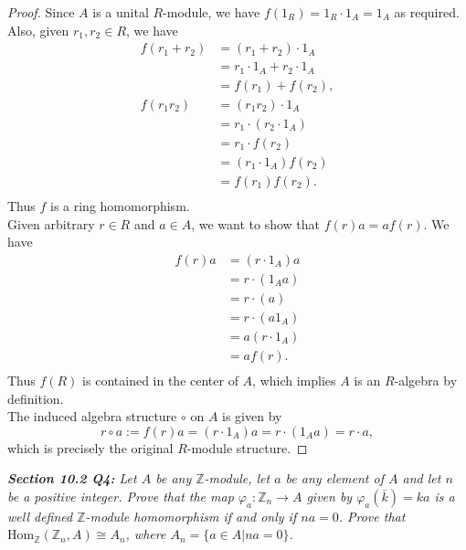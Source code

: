 \documentclass{article}
\begin{document}
  \begin{proof}
    Since $A$ is a unital $R$-module, we have $f(1_R)=1_R\cdot1_A=1_A$ as
    required. Also, given $r_1,r_2\in R$, we have
    \begin{align*}
      f(r_1+r_2) &=(r_1+r_2)\cdot1_A \\
      &=r_1\cdot1_A + r_2\cdot1_A \\
      &=f(r_1)+f(r_2), \\
      f(r_1r_2) &=(r_1r_2)\cdot1_A \\
      &=r_1\cdot(r_2\cdot1_A) \\
      &=r_1\cdot f(r_2) \\
      &=(r_1\cdot1_A)f(r_2) \\
      &=f(r_1)f(r_2). \\
    \end{align*}
    Thus $f$ is a ring homomorphism. \\

    Given arbitrary $r\in R$ and $a\in A$, we want to show that
    $f(r)a=af(r)$. We have
    \begin{align*}
      f(r)a &=(r\cdot1_A)a \\
      &=r\cdot(1_Aa) \\
      &=r\cdot(a) \\
      &=r\cdot(a1_A) \\
      &=a(r\cdot1_A) \\
      &=af(r). \\
    \end{align*}
    Thus $f(R)$ is contained in the center of $A$, which implies $A$ is an
    $R$-algebra by definition. \\

    The induced algebra structure $\circ$ on $A$ is given by
    \[r\circ a:=f(r)a=(r\cdot1_A)a=r\cdot(1_Aa)=r\cdot a,\]
    which is precisely the original $R$-module structure.
  \end{proof}

\it \textbf{Section 10.2 Q4:} Let $A$ be any $\mathbb{Z}$-module, let $a$
  be any element of $A$ and let $n$ be a positive integer. Prove that the
  map $\varphi_a:\mathbb{Z}_n\rightarrow A$ given by $\varphi_a(\bar{k})=ka$
  is a well defined $\mathbb{Z}$-module homomorphism if and only if
  $na=0$. Prove that $\text{Hom}_{\mathbb{Z}}(\mathbb{Z}_n,A)\cong A_n$,
  where $A_n=\{a\in A|na=0\}$.
\end{document}
